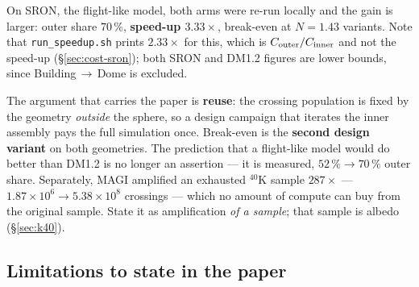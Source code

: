 \documentclass[11pt,a4paper]{article}
\begin{document}
On SRON, the flight-like model, both arms were re-run locally and the gain is
larger: outer share $70\,\%$, \textbf{speed-up $3.33\times$}, break-even at
$N = 1.43$ variants. Note that \texttt{run\_speedup.sh} prints $2.33\times$ for
this, which is $C_{\rm outer}/C_{\rm inner}$ and not the speed-up
(\S\ref{sec:cost-sron}); both SRON and DM1.2 figures are lower bounds, since
Building\,$\to$\,Dome is excluded.

The argument that carries the paper is \textbf{reuse}: the crossing population is
fixed by the geometry \emph{outside} the sphere, so a design campaign that
iterates the inner assembly pays the full simulation once. Break-even is the
\textbf{second design variant} on both geometries. The prediction that a
flight-like model would do better than DM1.2 is no longer an assertion --- it is
measured, $52\,\% \to 70\,\%$ outer share. Separately,
MAGI amplified an exhausted $^{40}$K sample $287\times$ ---
$1.87\times10^{6} \to 5.38\times10^{8}$ crossings --- which no amount of compute
can buy from the original sample. State it as amplification \emph{of a sample};
that sample is albedo (\S\ref{sec:k40}).

\subsection*{Limitations to state in the paper}
\end{document}
